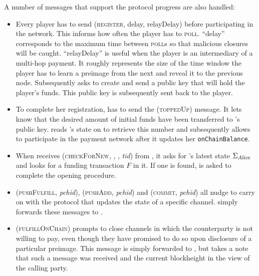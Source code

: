   A number of  messages that support the protocol progress are also handled:
  \begin{itemize}
    \item Every player has to send (\textsc{register}, delay, relayDelay) before
    participating in the network. This informs \fpaynet{} how often the player
    has to \textsc{poll}. ``delay'' corresponds to the maximum time between
    \textsc{poll}s so that malicious closures will be caught. ``relayDelay'' is
    useful when the player is an intermediary of a multi-hop payment. It roughly
    represents the size of the time window the player has to learn a preimage
    from the next and reveal it to the previous node. Subsequently \fpaynet{}
    asks \simulator{} to create and send a public key that will hold the
    player's funds. This public key is subsequently sent back to the player.
    \item To complete her registration, \alice{} has to send the
    (\textsc{toppedUp}) message. It lets \fpaynet{} know that the desired amount
    of initial funds have been transferred to \alice's public key. \fpaynet{}
    reads \alice's state on \ledger{} to retrieve this number and subsequently
    allows \alice{} to participate in the payment network after it updates her  \texttt{onChainBalance}.
    \item When \fpaynet{} receives (\textsc{checkForNew}, \alice, \bob,
    \textit{tid}) from \alice, it asks \ledger{} for \alice's latest state
    $\Sigma_{\mathit{Alice}}$ and looks for a funding transaction $F$ in it. If one is
    found, \simulator{} is asked to complete the opening procedure.
    \item (\textsc{pushFulfill}, \textit{pchid}),
    (\textsc{pushAdd}, \textit{pchid}) and (\textsc{commit}, \textit{pchid})
    all nudge \simulator{} to carry on with the protocol that updates the state
    of a specific channel. \fpaynet{} simply forwards these messages to
    \simulator.
    \item (\textsc{fulfillOnChain}) prompts \simulator{} to close channels in which
    the counterparty is not willing to pay, even though they have promised to do
    so upon disclosure of a particular preimage. This message is simply forwarded to
    \simulator{}, but \fpaynet{} takes a note that such a message was
    received and the current blockheight in the view of the calling party.
  \end{itemize}

